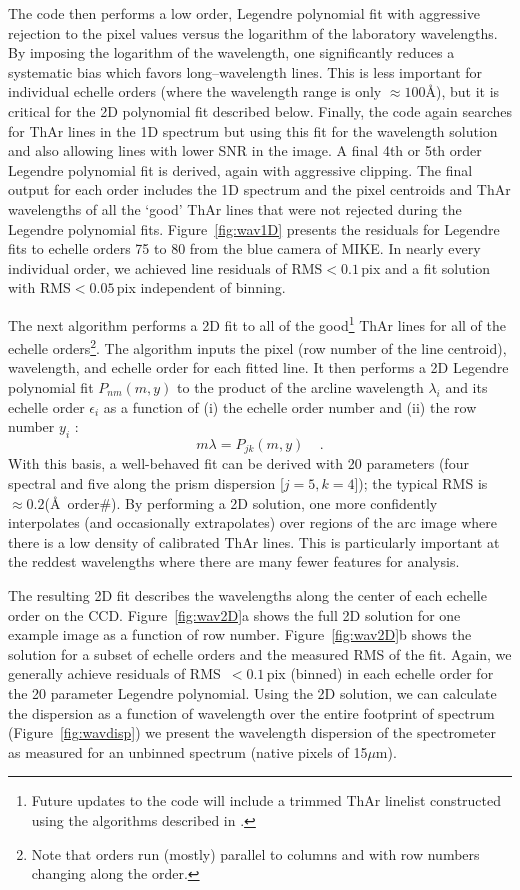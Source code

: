 \documentclass[12pt,preprint]{aastex}
\begin{document}
The code then performs a low order, Legendre polynomial
fit with aggressive rejection
to the pixel values versus the logarithm of the laboratory
wavelengths.  By imposing the logarithm of the wavelength, 
one significantly reduces a systematic bias 
which favors long--wavelength lines.
This is less important for individual echelle 
orders (where the wavelength range is only
$\approx 100$\AA), but it is critical for the 2D polynomial
fit described below.
Finally, the code again searches for ThAr lines in the 1D
spectrum but using this fit for the wavelength solution and also
allowing lines with lower SNR in the image.  A final 4th or 5th
order Legendre polynomial fit is derived, again with aggressive
clipping.  The final output for each order
includes the 1D spectrum and the pixel centroids and ThAr wavelengths
of all the `good' ThAr lines that were not rejected during
the Legendre polynomial fits.
Figure~\ref{fig:wav1D} presents the residuals for Legendre
fits to echelle orders 75 to 80 from the blue camera of MIKE.
In nearly every individual order, we achieved line residuals 
of RMS$<0.1$\,pix
and a fit solution with RMS$<0.05$\,pix independent of binning.


The next algorithm performs a 2D fit to all of the good\footnote{Future
updates to the code will include a trimmed ThAr linelist
constructed using the algorithms described in \cite{murphy07}.}
ThAr lines for all of the echelle orders\footnote{Note 
that orders run (mostly) parallel to columns
and with row numbers changing along the order.}. 
The algorithm inputs the pixel (row
number of the line centroid), 
wavelength, and echelle order for each fitted line. 
It then performs a 2D Legendre
polynomial fit $P_{nm}(m,y)$
to the product of the arcline wavelength $\lambda_i$ and its
echelle order $\epsilon_i$ as a function of 
(i) the echelle order number and (ii)
the row number $y_i$ \citep[e.g.][]{iraf}:
\begin{equation}
m \lambda = P_{jk}(m, y) \;\;\;\; .
\end{equation}
With this basis, a well-behaved fit can be derived with 20 
parameters (four spectral and five along the prism dispersion [$j=5,k=4$]);
the typical RMS is $\approx 0.2$(\AA\ order\#).
By performing a 2D solution, one more confidently interpolates
(and occasionally extrapolates)
over regions of the arc image where there is a low density of 
calibrated ThAr lines.
This is particularly important at the reddest wavelengths
where there are many fewer features for analysis. 

The resulting 2D fit describes the wavelengths along the 
center of each echelle order on the CCD.
Figure~\ref{fig:wav2D}a shows the full 2D solution for one example
image as a function of row number.
Figure~\ref{fig:wav2D}b shows the solution for a subset of 
echelle orders and the measured RMS of the fit.  Again, we
generally achieve residuals of RMS~$< 0.1$\,pix (binned) in each
echelle order for the 20 parameter Legendre polynomial.
Using the 2D solution, we can calculate the
dispersion as a function of wavelength over the entire footprint 
of spectrum (Figure~\ref{fig:wavdisp}) we present the wavelength dispersion
of the spectrometer as measured for an unbinned spectrum
(native pixels of 15$\mu$m). 
\end{document}

